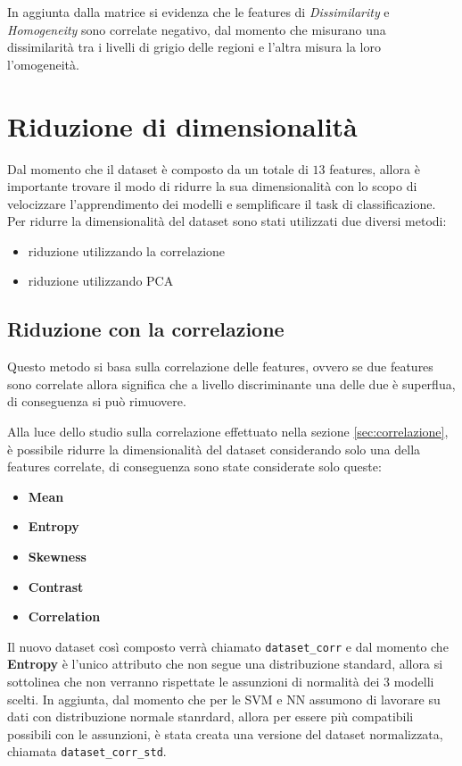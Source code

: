 In aggiunta dalla matrice si evidenza che le features di \textit{Dissimilarity}
e \textit{Homogeneity} sono correlate negativo, dal momento che misurano una
dissimilarità tra i livelli di grigio delle regioni e l'altra misura la loro
l'omogeneità.

\section{Riduzione di dimensionalità} \label{sec:riduzone_di_dimensionalità}
Dal momento che il dataset è composto da un totale di $13$ features, allora
è importante trovare il modo di ridurre la sua dimensionalità con lo scopo di
velocizzare l'apprendimento dei modelli e semplificare il task di classificazione.
Per ridurre la dimensionalità del dataset sono stati utilizzati due diversi metodi:
\begin{itemize}
      \item riduzione utilizzando la correlazione
      \item riduzione utilizzando PCA
\end{itemize}

\subsection{Riduzione con la correlazione} \label{sec:riduzione_correlazione}
Questo metodo si basa sulla correlazione delle features, ovvero se due features
sono correlate allora significa che a livello discriminante una delle due è superflua,
di conseguenza si può rimuovere.

Alla luce dello studio sulla correlazione effettuato nella sezione \ref{sec:correlazione},
è possibile ridurre la dimensionalità del dataset considerando solo una della
features correlate, di conseguenza sono state considerate solo queste:
\begin{itemize}
      \item \textbf{Mean}
      \item \textbf{Entropy}
      \item \textbf{Skewness}
      \item \textbf{Contrast}
      \item \textbf{Correlation}
\end{itemize}
Il nuovo dataset così composto verrà chiamato \texttt{dataset\_corr} e dal momento
che \textbf{Entropy} è l'unico attributo che non segue una distribuzione standard,
allora si sottolinea che non verranno rispettate le assunzioni di normalità dei
$3$ modelli scelti. In aggiunta, dal momento che per le SVM e NN assumono di
lavorare su dati con distribuzione normale stanrdard, allora per essere più
compatibili possibili con le assunzioni, è stata creata una versione del dataset
normalizzata, chiamata \texttt{dataset\_corr\_std}. 


